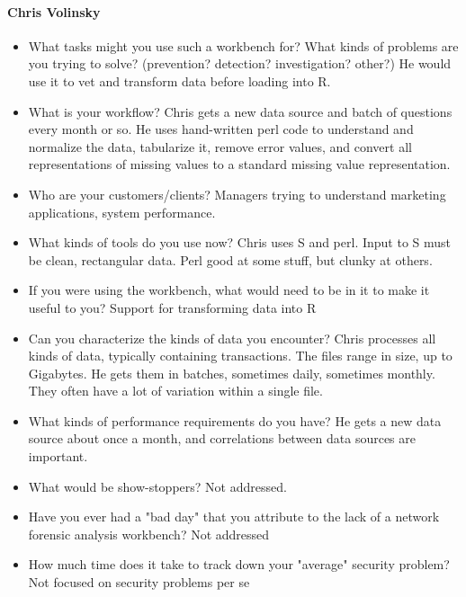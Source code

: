 \documentclass{article}
\begin{document}
\paragraph*{Chris Volinsky}
\begin{itemize}

\item What tasks might you use such a workbench for?  What kinds of
  problems are you trying to solve? (prevention? detection?
  investigation? other?) 
He would use it to vet and transform data before loading into R.

\item What is your workflow?
Chris gets a new data source and batch of questions every month or so.
He uses hand-written perl code to understand and normalize the data,
tabularize it, remove error values, and convert all representations of
missing values to a standard missing value representation.  

\item Who are your customers/clients?  
Managers trying to understand marketing applications, system performance. 

\item What kinds of tools do you use now?  
Chris uses  S and  perl. 
Input to S must be clean, rectangular data.  Perl good at some stuff, but clunky at others.  

\item If you were using the workbench, what would need to be in it to make it useful to you?
Support for transforming data into R

\item Can you characterize the kinds of data you encounter?
Chris processes all kinds of data, typically containing transactions.
The files range in size, up to Gigabytes.  He gets them in batches,
sometimes daily, sometimes monthly.  They often have a lot of
variation within a single file.

\item What kinds of performance requirements do you have?  
He gets a new data source about once a month, and correlations between
data sources are important.

\item What would be show-stoppers?  
Not addressed.

\item Have you ever had a "bad day" that you attribute to the lack of
  a network forensic analysis workbench?
Not addressed

\item How much time does it take to track down your "average" security problem?
Not focused on security problems per se


\end{itemize}
\end{document}
